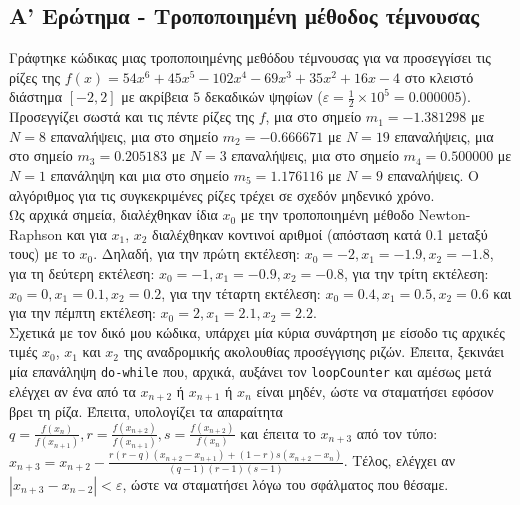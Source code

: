 \documentclass[a4paper, 14pt]{article}   %
\begin{document}
\subsection*{Α' Ερώτημα - Τροποποιημένη μέθοδος τέμνουσας}   %

Γράφτηκε κώδικας μιας τροποποιημένης μεθόδου τέμνουσας για να προσεγγίσει τις ρίζες της \(f(x) = 54x^6 + 45x^5 - 102x^4 - 69x^3 + 35x^2 + 16x - 4\) στο κλειστό διάστημα \([-2,2]\) με ακρίβεια $5$ δεκαδικών ψηφίων (\(\varepsilon = \frac{1}{2} \times 10^5 = 0.000005\)). Προσεγγίζει σωστά και τις πέντε ρίζες της \(f\), μια στο σημείο \(m_1 = -1.381298\) με \(N = 8\) επαναλήψεις, μια στο σημείο \(m_2 = -0.666671\) με \(N = 19\) επαναλήψεις, μια στο σημείο \(m_3 = 0.205183\) με \(N = 3\) επαναλήψεις, μια στο σημείο \(m_4 = 0.500000\) με \(N = 1\) επανάληψη και μια στο σημείο \(m_5 = 1.176116\) με \(N = 9\) επαναλήψεις. Ο αλγόριθμος για τις συγκεκριμένες ρίζες τρέχει σε σχεδόν μηδενικό χρόνο.\\

Ως αρχικά σημεία, διαλέχθηκαν ίδια \(x_0\) με την τροποποιημένη μέθοδο Newton-Raphson και για \(x_1\), \(x_2\) διαλέχθηκαν κοντινοί αριθμοί (απόσταση κατά 0.1 μεταξύ τους) με το \(x_0\). Δηλαδή, για την πρώτη εκτέλεση: \(x_0=-2, x_1=-1.9, x_2=-1.8\), για τη δεύτερη εκτέλεση: \(x_0=-1, x_1=-0.9, x_2=-0.8\), για την τρίτη εκτέλεση: \(x_0=0, x_1=0.1, x_2=0.2\), για την τέταρτη εκτέλεση: \(x_0=0.4, x_1=0.5, x_2=0.6\) και για την πέμπτη εκτέλεση: \(x_0=2, x_1=2.1, x_2=2.2\).\\

Σχετικά με τον δικό μου κώδικα, υπάρχει μία κύρια συνάρτηση με είσοδο τις αρχικές τιμές \(x_0\), \(x_1\) και \(x_2\) της αναδρομικής ακολουθίας προσέγγισης ριζών. Έπειτα, ξεκινάει μία επανάληψη \texttt{do-while} που, αρχικά, αυξάνει τον \texttt{loopCounter} και αμέσως μετά ελέγχει αν ένα από τα \(x_{n+2}\) ή \(x_{n+1}\) ή \(x_n\) είναι μηδέν, ώστε να σταματήσει εφόσον βρει τη ρίζα. Έπειτα, υπολογίζει τα απαραίτητα \(q=\frac{f(x_n)}{f(x_{n+1})}, r=\frac{f(x_{n+2})}{f(x_{n+1})}, s=\frac{f(x_{n+2})}{f(x_n)}\) και έπειτα το \(x_{n+3}\) από τον τύπο: \(x_{n+3} = x_{n+2} - \frac{r(r-q)(x_{n+2}-x_{n+1}) + (1-r)s(x_{n+2} - x_n)}{(q-1)(r-1)(s-1)}\). Τέλος, ελέγχει αν \(|x_{n+3} - x_{n-2}| < \varepsilon\), ώστε να σταματήσει λόγω του σφάλματος που θέσαμε.\\
\end{document}
